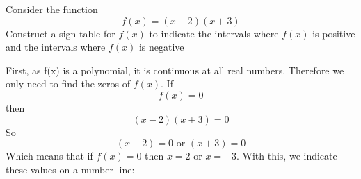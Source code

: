 \documentclass{ximera}
\begin{document}
\begin{example}
Consider the function 
\[
f(x) = (x-2)(x+3)
\]
 Construct a sign table for $f(x)$ to indicate the intervals where $f(x)$ is positive and the intervals where $f(x)$ is negative


\begin{explanation}
First, as f(x) is a polynomial, it is continuous at all real numbers. Therefore we only need to find the zeros of $f(x)$. If 
\[
f(x) = 0
\]
then
\[ 
(x-2)(x+3) = 0
\]
So 
\[ 
(x-2)= 0 \text{ or } (x+3) = 0
\]
Which means that if $f(x)=0$ then $x=2$ or $x=-3$. With this, we indicate these values on a number line:

\begin{image}
\end{image}
\end{explanation}
\end{example}
\end{document}
